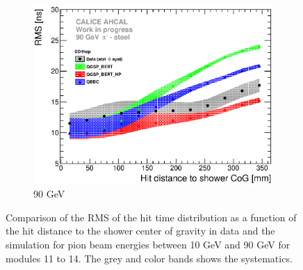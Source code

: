 \begin{figure}[htbp!]
\begin{subfigure}[t]{0.49\textwidth}
    \centering
    \includegraphics[width=1\textwidth]{../Thesis_Plots/Timing/Pions/Plots/ComparisonToSim/RMS_Radius_90GeV_BL_DD4hep.eps}
    \caption{90 GeV}\label{fig:Radius_BL_RMS_SimData_90GeV_DD4hep}
  \end{subfigure}
  \caption{Comparison of the RMS of the hit time distribution as a function of the hit distance to the shower center of gravity in data and the \ddhep simulation for pion beam energies between 10 GeV and 90 GeV for modules 11 to 14. The grey and color bands shows the systematics.}
  \label{fig:Radius_BL_RMS_SimData_Comparison_DD4hep}
\end{figure}



